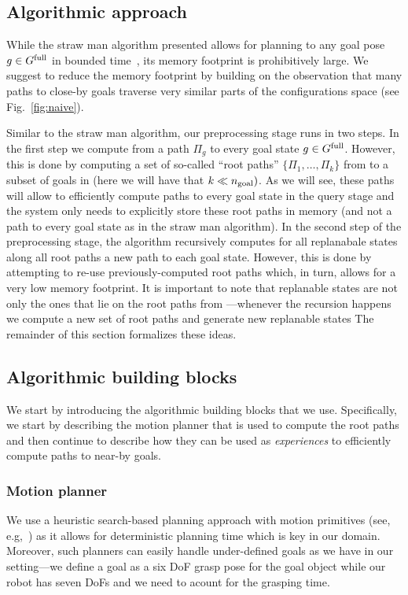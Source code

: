 \documentclass[conference]{IEEEtran}
\begin{document}
\subsection{Algorithmic approach}
While the straw man algorithm presented  allows for planning to any goal pose $ g \in G^{\textrm{full}}$ in bounded time~\Tbound, its memory footprint is prohibitively large.
%
We suggest to reduce the memory footprint by building on the observation that many paths to close-by goals traverse very similar parts of the configurations space (see Fig.~\ref{fig:naive}).

Similar to the straw man algorithm, our preprocessing stage runs in two steps.
In the first step we  compute from \Shome a path $\Pi_g$ to every goal state $ g \in G^{\textrm{full}}$. However, this is done by computing a set of so-called ``root paths'' $\{\Pi_1, \ldots, \Pi_k \}$ from \Shome to a subset of goals in \Gfull (here we will have that $k \ll n_{\rm goal})$. 
As we will see, these paths will allow to efficiently compute paths to every goal state in the query stage and the system only needs to explicitly store these root paths in memory (and not a path to every goal state as in the straw man algorithm).
%
In the second step of the preprocessing stage, the algorithm recursively computes for all replanabale states along all root paths a new path to each goal state. However, this is done by attempting to re-use previously-computed root paths which, in turn, allows for a very low memory footprint.
%
It is important to note that replanable states are not only the ones that lie on the root paths from \Shome---whenever the recursion happens we compute a new set of root paths and generate new replanable states
%
The remainder of this section formalizes these ideas.

\subsection{Algorithmic building blocks}
We start by introducing the algorithmic building blocks that we use.
Specifically, we start by describing the motion planner that is used to compute the root paths 
and then continue to describe how they can be used as \emph{experiences} to efficiently compute paths to near-by goals.
\subsubsection{Motion planner}
We use a heuristic search-based planning approach with motion primitives (see, e.g,~\cite{CCL10,CSCL11,LF09})
as it allows for deterministic planning time which is key in our domain.
Moreover, such planners can easily handle under-defined goals as we have in our setting---we define a goal as a six DoF grasp pose for the goal object while our robot has seven DoFs and we need to acount for the grasping time.
\end{document}
